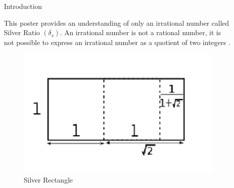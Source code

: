 \documentclass[final]{beamer}
\newlength{\sepwid}
\newlength{\onecolwid}
\newlength{\twocolwid}
\begin{document}
\begin{frame}[t]
\begin{columns}[t]
\begin{column}{\onecolwid}

\begin{block}{Introduction}

This poster provides an understanding of only an irrational  number called Silver Ratio $(\delta_s)$. An irrational  number is  not  a rational  number, it is not possible to express an irrational number as a quotient of two integers \cite{project_des}.

\end{block}


\begin{figure}
\includegraphics[width=0.8\linewidth]{silver_ratio.png}
\caption{Silver Rectangle}
\end{figure}


\end{column} %

\begin{column}{\sepwid}\end{column} %

\begin{column}{\twocolwid} %

\begin{columns}[t,totalwidth=\twocolwid] %

\begin{column}{\onecolwid}\vspace{-.6in} %


\end{column}
\end{columns}
\end{column}
\end{columns}
\end{frame}
\end{document}
